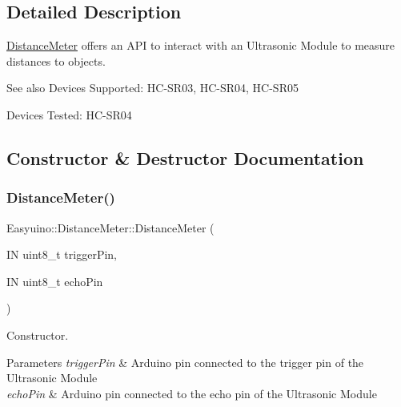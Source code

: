 \subsection{Detailed Description}
\hyperlink{class_easyuino_1_1_distance_meter}{Distance\+Meter} offers an A\+PI to interact with an Ultrasonic Module to measure distances to objects. 

\begin{DoxySeeAlso}{See also}
Devices Supported\+: H\+C-\/\+S\+R03, H\+C-\/\+S\+R04, H\+C-\/\+S\+R05 

Devices Tested\+: H\+C-\/\+S\+R04 
\end{DoxySeeAlso}


\subsection{Constructor \& Destructor Documentation}
\mbox{\label{class_easyuino_1_1_distance_meter_aad61ebf8398ba5cf6a80e5defc29bfcc}} 
\subsubsection{\texorpdfstring{Distance\+Meter()}{DistanceMeter()}\hspace{0.1cm}{\footnotesize\ttfamily [1/2]}}
{\footnotesize\ttfamily Easyuino\+::\+Distance\+Meter\+::\+Distance\+Meter (\begin{DoxyParamCaption}\item[{IN uint8\+\_\+t}]{trigger\+Pin,  }\item[{IN uint8\+\_\+t}]{echo\+Pin }\end{DoxyParamCaption})}



Constructor. 


\begin{DoxyParams}{Parameters}
{\em trigger\+Pin} & Arduino pin connected to the trigger pin of the Ultrasonic Module \\
\hline
{\em echo\+Pin} & Arduino pin connected to the echo pin of the Ultrasonic Module \\
\hline
\end{DoxyParams}
\mbox{\label{class_easyuino_1_1_distance_meter_aa5551cc3c42fe77f0972a41acf896cf9}} 
